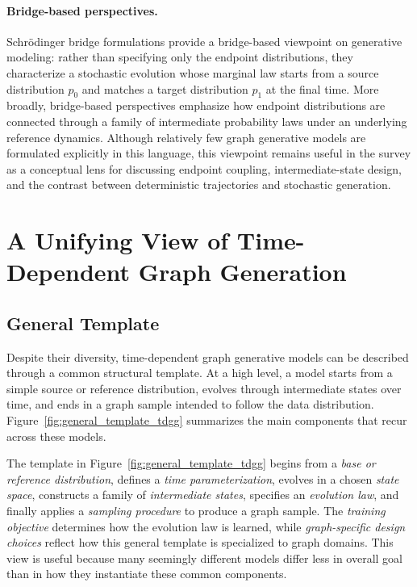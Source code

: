 \documentclass{article}
\begin{document}
\paragraph{Bridge-based perspectives.}
Schr\"odinger bridge formulations provide a bridge-based viewpoint on generative modeling: rather than specifying only the endpoint distributions, they characterize a stochastic evolution whose marginal law starts from a source distribution $p_0$ and matches a target distribution $p_1$ at the final time. More broadly, bridge-based perspectives emphasize how endpoint distributions are connected through a family of intermediate probability laws under an underlying reference dynamics. Although relatively few graph generative models are formulated explicitly in this language, this viewpoint remains useful in the survey as a conceptual lens for discussing endpoint coupling, intermediate-state design, and the contrast between deterministic trajectories and stochastic generation.


\section{A Unifying View of Time-Dependent Graph Generation}
\label{sec:unifying_view}

\subsection{General Template}
\label{sec:general_template}

Despite their diversity, time-dependent graph generative models can be described through a common structural template. At a high level, a model starts from a simple source or reference distribution, evolves through intermediate states over time, and ends in a graph sample intended to follow the data distribution. Figure~\ref{fig:general_template_tdgg} summarizes the main components that recur across these models.



The template in Figure~\ref{fig:general_template_tdgg}  begins from a \emph{base or reference distribution}, defines a \emph{time parameterization}, evolves in a chosen \emph{state space}, constructs a family of \emph{intermediate states}, specifies an \emph{evolution law}, and finally applies a \emph{sampling procedure} to produce a graph sample. The \emph{training objective} determines how the evolution law is learned, while \emph{graph-specific design choices} reflect how this general template is specialized to graph domains. This view is useful because many seemingly different models differ less in overall goal than in how they instantiate these common components.
\end{document}
